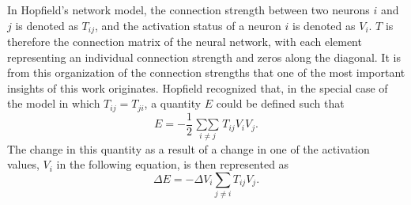 \documentclass[11pt]{afthesis}
\begin{document}
	In Hopfield's network model, the connection strength between two neurons \begin{math}i\end{math} and  \begin{math}j\end{math} is denoted as \begin{math}T_{ij}\end{math}, and the activation status of a neuron \begin{math}i\end{math} is denoted as  \begin{math}V_i\end{math}. \begin{math}T\end{math} is therefore the connection matrix of the neural network, with each element representing an individual connection strength and zeros along the diagonal. It is from this organization of the connection strengths that one of the most important insights of this work originates. Hopfield recognized that, in the special case of the model in which \begin{math}T_{ij}=T_{ji}\end{math}, a quantity \begin{math}E\end{math} could be defined such that \begin{equation} 
	E= -\frac{1}{2} \mathop{\sum\sum}\limits_{i \neq j} T_{ij} V_i V_j .
	\end{equation} The change in this quantity as a result of a change in one of the activation values, \begin{math}V_i\end{math} in the following equation, is then represented as \begin{equation} 
	\Delta E= -\Delta V_i  \sum\limits_{j \neq i} T_{ij} V_j .

\end{equation}
\end{document}
